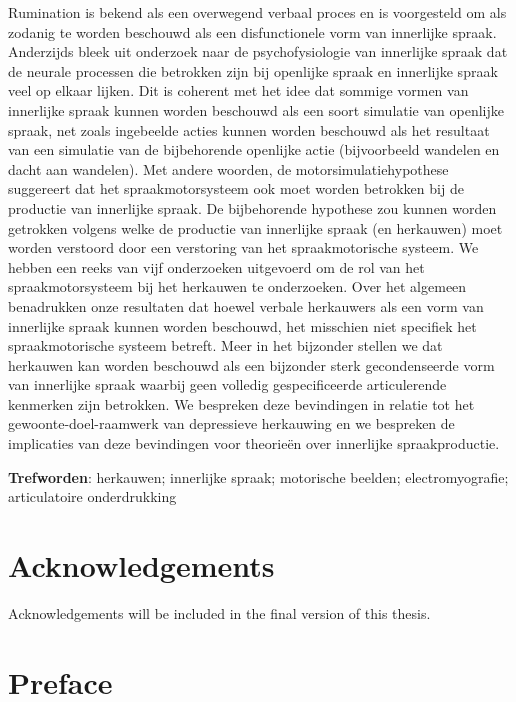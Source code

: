\documentclass[a4paper,12pt,twoside,openright,oldfontcommands]{memoir}
\newcommand{\initial}[1]{
	\lettrine[lines=3,lhang=0.33,nindent=0em]{
		\color{gray}
     		{\textsc{#1}}}{}}
\newcommand\blankpage{%
    \null
    \thispagestyle{empty}%
    \newpage
    }
\newcommand{\clearemptydoublepage}{\newpage{\thispagestyle{empty}\cleardoublepage}}
\begin{document}
\initial{R}umination is bekend als een overwegend verbaal proces en is voorgesteld om als zodanig te worden beschouwd als een disfunctionele vorm van innerlijke spraak. Anderzijds bleek uit onderzoek naar de psychofysiologie van innerlijke spraak dat de neurale processen die betrokken zijn bij openlijke spraak en innerlijke spraak veel op elkaar lijken. Dit is coherent met het idee dat sommige vormen van innerlijke spraak kunnen worden beschouwd als een soort simulatie van openlijke spraak, net zoals ingebeelde acties kunnen worden beschouwd als het resultaat van een simulatie van de bijbehorende openlijke actie (bijvoorbeeld wandelen en dacht aan wandelen). Met andere woorden, de motorsimulatiehypothese suggereert dat het spraakmotorsysteem ook moet worden betrokken bij de productie van innerlijke spraak. De bijbehorende hypothese zou kunnen worden getrokken volgens welke de productie van innerlijke spraak (en herkauwen) moet worden verstoord door een verstoring van het spraakmotorische systeem. We hebben een reeks van vijf onderzoeken uitgevoerd om de rol van het spraakmotorsysteem bij het herkauwen te onderzoeken. Over het algemeen benadrukken onze resultaten dat hoewel verbale herkauwers als een vorm van innerlijke spraak kunnen worden beschouwd, het misschien niet specifiek het spraakmotorische systeem betreft. Meer in het bijzonder stellen we dat herkauwen kan worden beschouwd als een bijzonder sterk gecondenseerde vorm van innerlijke spraak waarbij geen volledig gespecificeerde articulerende kenmerken zijn betrokken. We bespreken deze bevindingen in relatie tot het gewoonte-doel-raamwerk van depressieve herkauwing en we bespreken de implicaties van deze bevindingen voor theorieën over innerlijke spraakproductie.

\vspace{\baselineskip}

\textbf{Trefworden}: herkauwen; innerlijke spraak; motorische beelden; electromyografie; articulatoire onderdrukking

\clearemptydoublepage

\chapter*{Acknowledgements}

\initial{A}cknowledgements will be included in the final version of this thesis.

\afterpage{\blankpage}

\chapter*{Preface}
\end{document}
